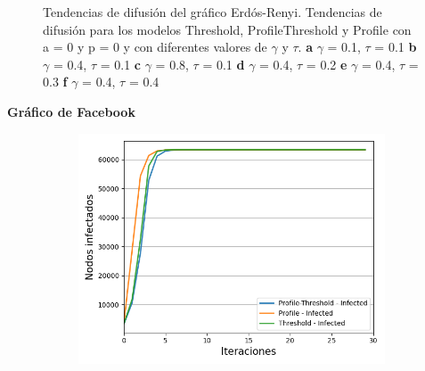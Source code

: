 \documentclass{article}
\begin{document}
\begin{figure}[!tbp]
\begin{subfigure}[b]{0.5\textwidth}
		\caption{}
		\label{fig:f36}
	\end{subfigure}
	\caption{Tendencias de difusión del gráfico Erdós-Renyi. Tendencias de difusión para los modelos Threshold, ProfileThreshold y Profile con a = 0 y p = 0 y con diferentes valores de $\gamma$ y $\tau$.
		\textbf{a} $\gamma$ = 0.1, $\tau$ = 0.1 \textbf{b} $\gamma$ = 0.4, $\tau$ = 0.1 \textbf{c} $\gamma$ = 0.8, $\tau$ = 0.1 \textbf{d} $\gamma$ = 0.4, $\tau$ = 0.2 \textbf{e} $\gamma$ = 0.4, $\tau$ = 0.3 \textbf{f} $\gamma$ = 0.4, $\tau$ = 0.4}
\end{figure}

\textbf{Gráfico de Facebook}
\begin{figure}[!tbp]
	\begin{subfigure}[b]{0.5\textwidth}
		\includegraphics[width=\textwidth, height=\textwidth]{../Images/Fig 4 a).png}
		\caption{}
		\label{fig:f41}
	\end{subfigure}
	\hfill
	\begin{subfigure}[b]{0.5\textwidth}

\end{subfigure}
\end{figure}
\end{document}
